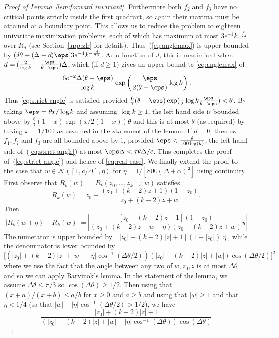 \begin{proof}[Proof of Lemma~\ref{lem:forward invariant}]
Furthermore both $f_2$ and $f_3$ have no critical points strictly inside the first quadrant, so again their maxima must be attained at a boundary point.
This allows us to reduce the problem to eighteen univariate maximization problems, each of which has maximum at most $3 e^{-1}k^{-\frac{d}{2\Delta}}$ over $\widetilde{R}_d$ (see Section~\ref{app:zfr} for details).
%
Thus~(\ref{eq:anglemax})  is upper bounded by  $(d\theta+(\Delta-d)\eps)3 e^{-1}k^{-\frac{d}{2\Delta}}$. As a function of $d$, this is maximised when $d = (\frac{2}{\log k} - \frac{\eps}{\theta - \eps})\Delta$, which  (if $d \geq 1$) gives an upper bound to \eqref{eq:anglemax} of 
\[
\frac{6e^{-2}\Delta(\theta - \eps)}{\log k} \exp\left(  \frac{\eps}{2(\theta - \eps)} \log k\right). 
\]
Thus \eqref{eq:strict angle} is satisfied provided $\frac{6}{7}(\theta - \eps)\exp( \frac{1}{2}\log k \frac{\eps}{\theta - \eps}) < \theta$. By taking $\eps = \theta x / \log k$ and assuming $\log k \geq 1$, the left hand side is bounded above by $\frac{6}{7} (1-x)\exp(x/2(1-x))\theta$ and this is at most $\theta$ (as required) by taking $x = 1/100$ as assumed in the statement of the lemma.   
%
%
%
%
%
%
%
%
%
If $d=0$, then as $f_1, f_2$ and $f_3$ are all bounded above by $1$, provided $\eps < \frac{\theta}{100\log(k)}$, the left hand side of~(\ref{eq:strict angle}) at most $\eps \Delta < \tau \theta \Delta/c$.
This completes the proof of~(\ref{eq:strict angle}) and hence of \eqref{eq:real case}.
%
We finally extend the proof to the case that $w\in \mathcal{N}([1,c/\Delta],\eta)$ 
for $\eta= 1/[800(\Delta + \alpha)^2]$ using continuity.
First observe that $R_k(w):=R_k(z_0, \ldots, z_{k-2};w)$ satisfies 
\[
R_k(w) = z_0 + \frac{(z_0 + (k-2)z + 1)(1 - z_0)}{z_0 + (k-2)z + w}.
\] 
Then 
\[
|R_k(w + \eta) - R_k(w)| 
= \left| \frac{[z_0 + (k-2)z + 1](1 - z_0)}{(z_0 + (k-2)z + w + \eta)(z_0 + (k-2)z + w)}\eta \right| 
%
\]
The numerator is upper bounded by  $[|z_0| + (k-2)|z| + 1](1 + |z_0|)|\eta|$, while the denominator is lower bounded by 
\[
\big[(|z_0| + (k-2)|z| + |w| - |\eta|\cos^{-1}(\Delta \theta/2))(|z_0| + (k-2)|z| + |w|)\cos(\Delta \theta/2)\big]^2
\]
where we use the fact that the angle between any two of $w, z_0, z$ is at most $\Delta \theta$ and so we can apply Barvinok's lemma. In the statement of the lemma, we assume $\Delta \theta \leq \pi / 3$ so $\cos(\Delta \theta) \geq 1/2$. Then using that $(x+a)/(x+b) \leq a/b$ for $x\geq 0$ and $a\geq b$ and using that $|w| \geq 1$ and that $\eta < 1/4$ (so that $|w| - |\eta|\cos^{-1}(\Delta \theta/2) > 1/2$), we have
\[
\frac{|z_0| + (k-2)|z| + 1}{(|z_0| + (k-2)|z| + |w| - |\eta| \cos^{-1}(\Delta \theta) ) \cos(\Delta \theta)}
\]
\end{proof}
